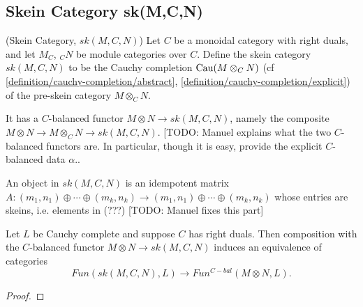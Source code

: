 \subsection{Skein Category sk(M,C,N)}

\begin{definition} (Skein Category, $sk(M,C,N)$) Let $C$ be a monoidal category with
  right duals, and let $M_C$, $_{C}N$ be module categories over $C$. Define
  the skein category $sk(M,C,N)$ to be the Cauchy completion $\operatorname{Cau}(M \otimes_{C} N)$
  (cf \ref{definition/cauchy-completion/abstract},
  \ref{definition/cauchy-completion/explicit}) of the pre-skein category
  $M \otimes_{C} N$.
\end{definition}

\noindent It has a $C$-balanced functor $M\otimes N \to sk(M,C,N)$, namely the
composite $M\otimes N\to M\otimes_C N\to sk(M,C,N)$. [TODO: Manuel explains what the two
$C$-balanced functors are. In particular, though it is easy, provide the
explicit $C$-balanced data $\alpha$..

\begin{remark}
An object in $sk(M,C,N)$ is an idempotent matrix $A:(m_1,n_1)\oplus\cdots\oplus (m_k,n_k)\to (m_1,n_1)\oplus\cdots\oplus (m_k,n_k)$ whose entries are skeins, i.e. elements in (???) [TODO: Manuel fixes this part]\end{remark}

\begin{proposition}\label{univ_sk}
  Let $L$ be Cauchy complete and suppose $C$ has right duals. Then composition
  with the $C$-balanced functor $M\otimes N\to sk(M,C,N)$ induces an
  equivalence of categories $$Fun(sk(M,C,N),L)\to Fun^{C-bal}(M\otimes N,L).$$
\end{proposition}

\begin{proof}
\end{proof}

